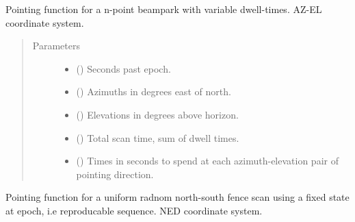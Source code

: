 \documentclass[letterpaper,10pt,english]{sphinxmanual}
\begin{document}
\begin{fulllineitems}
\label{\detokenize{modules/radar_scan_library:radar_scan_library.point_n_dyn_beampark}}
Pointing function for a n-point beampark with variable dwell-times. AZ-EL coordinate system.
\begin{quote}\begin{description}
\item[{Parameters}] \leavevmode\begin{itemize}
\item {} 
 () \textendash{} Seconds past epoch.

\item {} 
 () \textendash{} Azimuths in degrees east of north.

\item {} 
 () \textendash{} Elevations in degrees above horizon.

\item {} 
 () \textendash{} Total scan time, sum of dwell times.

\item {} 
 () \textendash{} Times in seconds to spend at each azimuth-elevation pair of pointing direction.

\end{itemize}

\end{description}\end{quote}

\end{fulllineitems}


\begin{fulllineitems}
\label{\detokenize{modules/radar_scan_library:radar_scan_library.point_ns_fence_rng_scan}}
Pointing function for a uniform radnom north-south fence scan using a fixed state at epoch, i.e reproducable sequence. NED coordinate system.

\end{fulllineitems}
\end{document}
